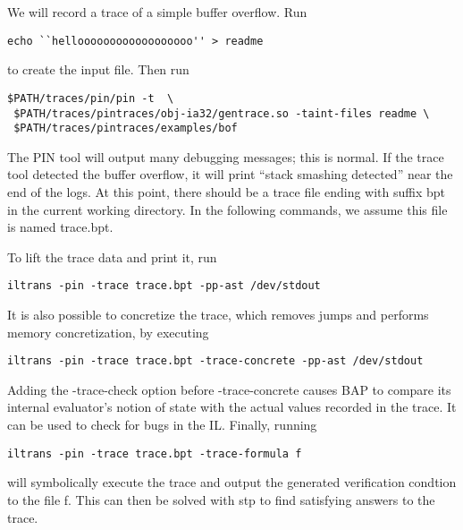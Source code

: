 We will record a trace of a simple buffer overflow.  Run 

\begin{verbatim}
echo ``helloooooooooooooooooo'' > readme
\end{verbatim}

 to create the input file.  Then run 

\begin{verbatim}
$PATH/traces/pin/pin -t  \
 $PATH/traces/pintraces/obj-ia32/gentrace.so -taint-files readme \
 $PATH/traces/pintraces/examples/bof
\end{verbatim}

The PIN tool will output
many debugging messages; this is normal.  If the trace tool detected
the buffer overflow, it will print ``stack smashing detected'' near
the end of the logs.  At this point, there should be a trace file
ending with suffix bpt in the current working directory.  In the
following commands, we assume this file is named trace.bpt.

To lift the trace data and print it, run 

\begin{verbatim}
iltrans -pin -trace trace.bpt -pp-ast /dev/stdout
\end{verbatim}

It is also possible to concretize the trace, which removes jumps and performs
memory concretization, by executing 

\begin{verbatim}
iltrans -pin -trace trace.bpt -trace-concrete -pp-ast /dev/stdout
\end{verbatim}

Adding the -trace-check option before -trace-concrete causes BAP to compare its
internal evaluator's notion of state with the actual values recorded in the
trace.  It can be used to check for bugs in the IL.  Finally, running 

\begin{verbatim}
iltrans -pin -trace trace.bpt -trace-formula f
\end{verbatim}

will symbolically execute the trace and output the generated verification
condtion to the file f. This can then be solved with stp to find satisfying
answers to the trace.
